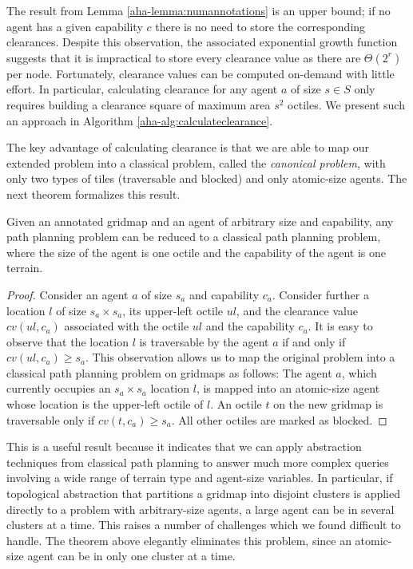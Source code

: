 The result from Lemma \ref{aha-lemma:numannotations} is an upper bound; if no agent has a given capability $c$ there is no need to store the corresponding clearances.
Despite this observation, the associated exponential growth function suggests that it is impractical to store every clearance value as there are $\Theta(2^{r})$ per node.
Fortunately, clearance values can be computed on-demand with little effort. 
In particular, calculating clearance for any agent $a$ of size $s \in S$ only requires building a clearance square of maximum area $s^2$ octiles. 
We present such an approach in Algorithm \ref{aha-alg:calculateclearance}. 

\par \indent
The key advantage of calculating clearance is that we are able to
map our extended problem into a classical problem, called the \emph{canonical problem}, with only two types of tiles (traversable and blocked) and only atomic-size agents. The next theorem formalizes this result.
\begin{theorem}
\label{aha-theorem:reducibility}
Given an annotated gridmap and an agent of arbitrary size and capability, any path planning problem can be reduced to a classical path planning problem, where the size of the agent is one octile and the capability of the agent is one terrain.
\end{theorem}

\begin{proof}
Consider an agent $a$ of size $s_a$ and capability $c_a$.
Consider further a location $l$ of size $s_a \times s_a$, its upper-left octile $\textit{ul}$,
and the clearance value $\textit{cv}(\textit{ul}, c_a)$ associated with the octile $\textit{ul}$ and the capability $c_a$.
It is easy to observe that the location $l$ is traversable by the agent $a$
if and only if $\textit{cv}(\textit{ul}, c_a) \geq s_a$.
This observation allows us to map the original problem into a classical path planning problem
on gridmaps as follows:
The agent $a$, which currently occupies an $s_a \times s_a$ location $l$, is mapped into an atomic-size agent whose location is the upper-left octile of $l$.
An octile $t$ on the new gridmap is traversable only if $\textit{cv}(t, c_a) \geq s_a$.
All other octiles are marked as blocked.
\end{proof}
This is a useful result because it indicates that we can apply abstraction techniques from classical path planning to answer much more complex queries involving a wide range of terrain type and agent-size variables. In particular, if topological abstraction that partitions a gridmap into disjoint clusters is applied directly to a problem with arbitrary-size agents, a large agent can be in several clusters at a time. This raises a number of challenges which we found difficult to handle. The theorem above elegantly eliminates this problem, since an atomic-size agent can be in only one cluster at a time.



